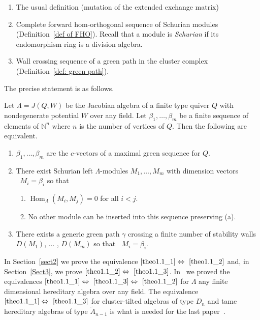 \documentclass[ALCO,ThmDefs,Unicode,epreuves]{cedram}
\DeclareMathOperator{\Hom}{Hom}%
\DeclareMathOperator{\undim}{\underline{dim}}
\newcommand{\field}[1]{\mathbb{#1}}
\newcommand{\NN}{\ensuremath{{\field{N}}}}
\begin{document}
\begin{enumerate}
\item\label{intro2_1} The usual definition (mutation of the extended exchange matrix)
\item\label{intro2_2} Complete forward hom-orthogonal sequence of Schurian modules (Definition~\ref{def of FHO}). Recall that a module is \emph{Schurian} if its endomorphism ring is a division algebra.
\item\label{intro2_3} Wall crossing sequence of a green path in the cluster complex (Definition~\ref{def: green path}).
\end{enumerate}

The precise statement is as follows.


\begin{theo}\label{main thm}
Let $\Lambda=J(Q,W)$ be the Jacobian algebra of a finite type quiver $Q$ with nondegenerate potential $W$ over any field. Let $\beta_1,\ldots,\beta_m$ be a finite sequence of elements of $\NN^n$ where $n$ is the number of vertices of $Q$. Then the following are equivalent.
\begin{enumerate}
\item\label{theo1.1_1} $\beta_1,\ldots,\beta_m$ are the $c$-vectors of a maximal green sequence for $Q$.
\item\label{theo1.1_2} There exist Schurian left $\Lambda$-modules $M_1,\ldots,M_m$ with dimension vectors $\undim M_i=\beta_i$ so that
\begin{enumerate}
\item\label{theo1.1_2_a} $\Hom_\Lambda(M_i,M_j)=0$ for all $i<j$.
\item\label{theo1.1_2_b} No other module can be inserted into this sequence preserving (a).
\end{enumerate}
\item\label{theo1.1_3} There exists a generic green path $\gamma$ crossing a finite number of stability walls $D(M_1)$, ... , $D(M_m)$ so that $\undim M_i=\beta_i$. 
\end{enumerate}
\end{theo}


In Section~\ref{sect2} we prove the equivalence $\eqref{theo1.1_1}\Leftrightarrow~\eqref{theo1.1_2}$ and, in Section~\ref{Sect3}, we prove $\eqref{theo1.1_2}\Leftrightarrow~\eqref{theo1.1_3}$.
In~\cite{PartI} we proved the equivalences $\eqref{theo1.1_1}\Leftrightarrow~\eqref{theo1.1_3}\Leftrightarrow~\eqref{theo1.1_2}$ for $\Lambda$ any finite dimensional hereditary algebra over any field. The equivalence $\eqref{theo1.1_1}\Leftrightarrow~\eqref{theo1.1_3}$ for cluster-tilted algebras of type $D_n$ and tame hereditary algebras of type $\tilde A_{n-1}$ is what is needed for the last paper~\cite{AI}.
\end{document}
